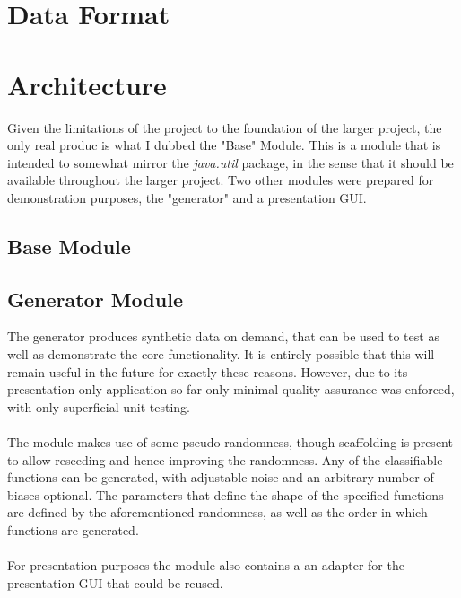 \documentclass[main.tex]{subfiles}
\begin{document}
  
  \section{Data Format}
    
    
    
  \section{Architecture}
    
    Given the limitations of the project to the foundation of the larger project, the only real produc is what I dubbed the "Base" Module. This is a module that is intended to somewhat mirror the \textit{java.util} package, in the sense that it should be available throughout the larger project. Two other modules were prepared for demonstration purposes, the "generator" and a presentation  GUI.
    
    \subsection{Base Module}
      
      
      
    \subsection{Generator Module}
      
      The generator produces synthetic data on demand, that can be used to test as well as demonstrate the core functionality. It is entirely possible that this will remain useful in the future for exactly these reasons. However, due to its presentation only application so far only minimal quality assurance was enforced, with only superficial unit testing.
      \\\\
      The module makes use of some pseudo randomness, though scaffolding is present to allow reseeding and hence improving the randomness. Any of the classifiable functions can be generated, with adjustable noise and an arbitrary number of biases optional. The parameters that define the shape of the specified functions are defined by the aforementioned randomness, as well as the order in which functions are generated.
      \\\\
      For presentation purposes the module also contains a an adapter for the presentation GUI that could be reused.
      
\end{document}
